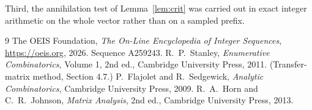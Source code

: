\documentclass[11pt,a4paper]{article}
\theoremstyle{plain}
\theoremstyle{definition}
\begin{document}
Third, the annihilation test of Lemma~\ref{lem:crit} was carried out in exact integer
arithmetic on the whole vector rather than on a sampled prefix.

\begin{thebibliography}{9}
 The OEIS Foundation, \emph{The On-Line Encyclopedia of Integer
Sequences}, \url{https://oeis.org}, 2026. Sequence A259243.
 R.~P.~Stanley, \emph{Enumerative Combinatorics}, Volume 1, 2nd ed.,
Cambridge University Press, 2011. (Transfer-matrix method, Section 4.7.)
 P.~Flajolet and R.~Sedgewick, \emph{Analytic Combinatorics}, Cambridge
University Press, 2009.
 R.~A.~Horn and C.~R.~Johnson, \emph{Matrix Analysis}, 2nd ed., Cambridge
University Press, 2013.
\end{thebibliography}
\end{document}
